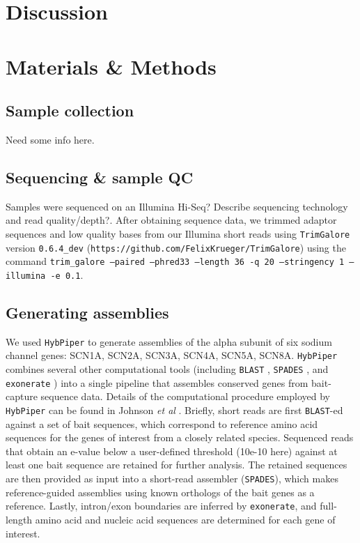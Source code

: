 \documentclass{article}
\begin{document}
\section*{Discussion}

\section*{Materials \& Methods}

\subsection*{Sample collection}

{\color{red} Need some info here}.

\subsection*{Sequencing \& sample QC}

Samples were sequenced on an Illumina {\color{red} Hi-Seq? Describe sequencing technology and read quality/depth?}. After obtaining sequence data, we trimmed adaptor sequences and low quality bases from our Illumina short reads using \texttt{TrimGalore} version \texttt{0.6.4\_dev} (\texttt{https://github.com/FelixKrueger/TrimGalore}) using the command \texttt{trim\_galore --paired --phred33 --length 36 -q 20 --stringency 1 --illumina -e 0.1}.

\subsection*{Generating assemblies}
We used \texttt{HybPiper} \cite{johnson2016hybpiper} to generate assemblies of the alpha subunit of six sodium channel genes: SCN1A, SCN2A, SCN3A, SCN4A, SCN5A, SCN8A.  \texttt{HybPiper} combines several other computational tools (including \texttt{BLAST} \cite{altschul1990basic}, \texttt{SPADES} \cite{bankevich2012spades}, and \texttt{exonerate} \cite{slater2005automated}) into a single pipeline that assembles conserved genes from bait-capture sequence data. Details of the computational procedure employed by \texttt{HybPiper} can be found in Johnson \textit{et al} \cite{johnson2016hybpiper}.  Briefly, short reads are first \texttt{BLAST}-ed against a set of bait sequences, which correspond to reference amino acid sequences for the genes of interest from a closely related species. Sequenced reads that obtain an e-value below a user-defined threshold (10e-10 here) against at least one bait sequence are retained for further analysis.  The retained sequences are then provided as input into a short-read assembler (\texttt{SPADES}), which makes reference-guided assemblies using known orthologs of the bait genes as a reference.  Lastly, intron/exon boundaries are inferred by \texttt{exonerate}, and full-length amino acid and nucleic acid sequences are determined for each gene of interest.
\end{document}
